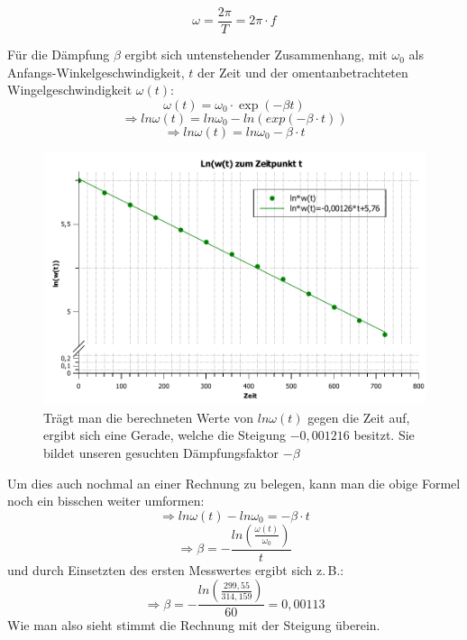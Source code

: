 \documentclass[a4paper]{scrartcl}
\begin{document}
	$$	\omega=\frac{2\pi}{T}=2\pi \cdot f$$
	

	 
	Für die Dämpfung $\beta$ ergibt sich untenstehender Zusammenhang, mit $\omega_0$ als Anfangs-Winkelgeschwindigkeit, $t$ der Zeit und der omentanbetrachteten Wingelgeschwindigkeit $\omega(t)$:\\
	 
	 $$ \omega(t)=\omega_0 \cdot \exp(-\beta t) $$
	 $$\Rightarrow ln\omega(t)=ln\omega_0-ln(exp(-\beta\cdot t))$$
	 $$ \Rightarrow ln\omega(t) = ln\omega_0 -\beta \cdot t $$

     \begin{figure}[H]
     \includegraphics[width=1\textwidth]{ln_w_t__.pdf}
\caption{\label{fig:ln_w_t_}Trägt man die berechneten Werte von $ln\omega(t)$ gegen die Zeit auf, ergibt sich eine Gerade, welche die Steigung $-0,001216$ besitzt. Sie bildet unseren gesuchten Dämpfungsfaktor $-\beta$}
\end{figure}
	 
	 Um dies auch nochmal an einer Rechnung zu belegen, kann man die obige Formel noch ein bisschen weiter umformen:
	 $$\Rightarrow ln\omega(t)-ln\omega_0=-\beta\cdot t$$
	 $$\Rightarrow \beta=-\frac{ln(\frac{\omega(t)}{\omega_0})}{t}$$
	 und durch Einsetzten des ersten Messwertes ergibt sich z.\,B.:
	 $$\Rightarrow \beta=-\frac{ln(\frac{299,55}{314,159})}{60}=0,00113$$
Wie man also sieht stimmt die Rechnung mit
 der Steigung überein.
\end{document}
